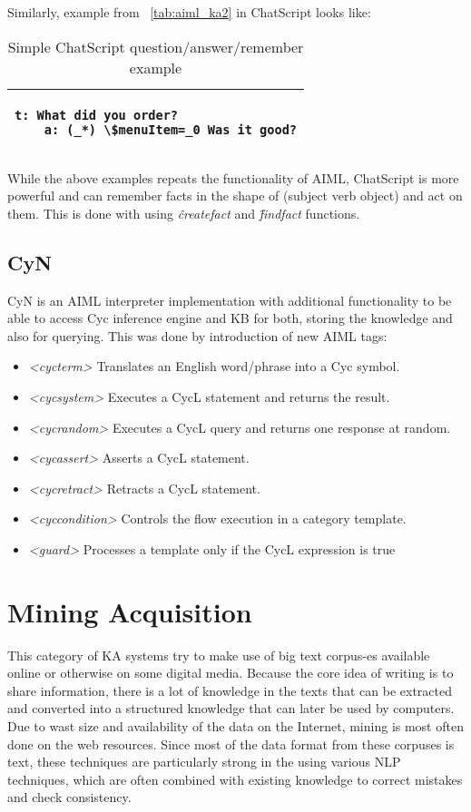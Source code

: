 Similarly, example from \tablename~\ref{tab:aiml_ka2} in ChatScript looks like:

\begin{table}[H]
	\caption{Simple ChatScript question/answer/remember example}
	\label{tab:chatscript_ka2}
	\centering
	\begin{tabular}{l}
		\hline
		\lstset{breaklines=true}
		\begin{lstlisting}
t: What did you order?
	a: (_*) \$menuItem=_0 Was it good?
		\end{lstlisting}  \\
		\hline
	\end{tabular}
\end{table}

While the above examples repeats the functionality of AIML, ChatScript is more 
powerful and can remember facts in the shape of (subject verb object) and act on
them. This is done with using \emph{\^createfact} and \emph{\^findfact} 
functions.

\subsection {CyN} 
\label{section:r:cyn}
CyN is an AIML interpreter implementation with additional functionality
to be able to access Cyc inference engine and KB for both, storing the knowledge 
and also for querying\parencite{Coursey2004}. This was done by introduction of new 
AIML tags:
\begin{itemize}
	\item \emph{<cycterm>} Translates an English word/phrase into a Cyc symbol.
	\item \emph{<cycsystem>} Executes a CycL statement and returns the result.
	\item \emph{<cycrandom>} Executes a CycL query and returns one response at random.
	\item \emph{<cycassert>} Asserts a CycL statement.
	\item \emph{<cycretract>} Retracts a CycL statement.
	\item \emph{<cyccondition>} Controls the flow execution in a category template.
	\item \emph{<guard>} Processes a template only if the CycL expression is true
\end{itemize} 

\section{Mining Acquisition}
\label{section:r:miningacq}
This category of KA systems try to make use of big text corpus-es 
available online or otherwise on some digital media. Because the core idea of 
writing is to share information, there is a lot of knowledge in the texts that 
can be extracted and converted into a structured knowledge that can later be used 
by computers. Due to wast size and availability of the data on the Internet,
mining is most often done on the web resources. Since most of the data format
from these corpuses is text, these techniques are particularly strong in the
using various NLP techniques, which are often combined with existing knowledge
to correct mistakes and check consistency.

